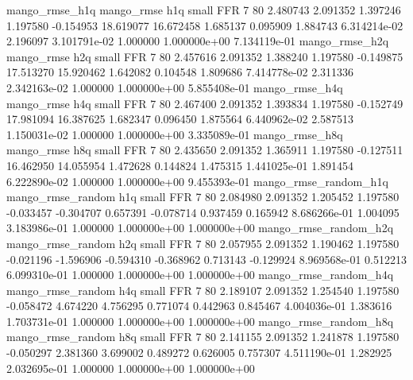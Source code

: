       mango_rmse_h1q        mango_rmse                  h1q      small      FFR                 7 80 2.480743       2.091352 1.397246       1.197580   -0.154953     18.619077     16.672458     1.685137       0.095909  1.884743 6.314214e-02     2.196097   3.101791e-02            1.000000    1.000000e+00        7.134119e-01
       mango_rmse_h2q        mango_rmse                  h2q      small      FFR                 7 80 2.457616       2.091352 1.388240       1.197580   -0.149875     17.513270     15.920462     1.642082       0.104548  1.809686 7.414778e-02     2.311336   2.342163e-02            1.000000    1.000000e+00        5.855408e-01
       mango_rmse_h4q        mango_rmse                  h4q      small      FFR                 7 80 2.467400       2.091352 1.393834       1.197580   -0.152749     17.981094     16.387625     1.682347       0.096450  1.875564 6.440962e-02     2.587513   1.150031e-02            1.000000    1.000000e+00        3.335089e-01
       mango_rmse_h8q        mango_rmse                  h8q      small      FFR                 7 80 2.435650       2.091352 1.365911       1.197580   -0.127511     16.462950     14.055954     1.472628       0.144824  1.475315 1.441025e-01     1.891454   6.222890e-02            1.000000    1.000000e+00        9.455393e-01
mango_rmse_random_h1q mango_rmse_random                  h1q      small      FFR                 7 80 2.084980       2.091352 1.205452       1.197580   -0.033457     -0.304707      0.657391    -0.078714       0.937459  0.165942 8.686266e-01     1.004095   3.183986e-01            1.000000    1.000000e+00        1.000000e+00
mango_rmse_random_h2q mango_rmse_random                  h2q      small      FFR                 7 80 2.057955       2.091352 1.190462       1.197580   -0.021196     -1.596906     -0.594310    -0.368962       0.713143 -0.129924 8.969568e-01     0.512213   6.099310e-01            1.000000    1.000000e+00        1.000000e+00
mango_rmse_random_h4q mango_rmse_random                  h4q      small      FFR                 7 80 2.189107       2.091352 1.254540       1.197580   -0.058472      4.674220      4.756295     0.771074       0.442963  0.845467 4.004036e-01     1.383616   1.703731e-01            1.000000    1.000000e+00        1.000000e+00
mango_rmse_random_h8q mango_rmse_random                  h8q      small      FFR                 7 80 2.141155       2.091352 1.241878       1.197580   -0.050297      2.381360      3.699002     0.489272       0.626005  0.757307 4.511190e-01     1.282925   2.032695e-01            1.000000    1.000000e+00        1.000000e+00
